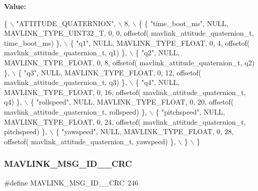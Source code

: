 {\bfseries Value\+:}
\begin{DoxyCode}
\{ \(\backslash\)
    \textcolor{stringliteral}{"ATTITUDE\_QUATERNION"}, \(\backslash\)
    8, \(\backslash\)
    \{  \{ \textcolor{stringliteral}{"time\_boot\_ms"}, NULL, MAVLINK_TYPE_UINT32_T, 0, 0, offsetof(
      mavlink_attitude_quaternion_t, time\_boot\_ms) \}, \(\backslash\)
         \{ \textcolor{stringliteral}{"q1"}, NULL, MAVLINK_TYPE_FLOAT, 0, 4, offsetof(
      mavlink_attitude_quaternion_t, q1) \}, \(\backslash\)
         \{ \textcolor{stringliteral}{"q2"}, NULL, MAVLINK_TYPE_FLOAT, 0, 8, offsetof(
      mavlink_attitude_quaternion_t, q2) \}, \(\backslash\)
         \{ \textcolor{stringliteral}{"q3"}, NULL, MAVLINK_TYPE_FLOAT, 0, 12, offsetof(
      mavlink_attitude_quaternion_t, q3) \}, \(\backslash\)
         \{ \textcolor{stringliteral}{"q4"}, NULL, MAVLINK_TYPE_FLOAT, 0, 16, offsetof(
      mavlink_attitude_quaternion_t, q4) \}, \(\backslash\)
         \{ \textcolor{stringliteral}{"rollspeed"}, NULL, MAVLINK_TYPE_FLOAT, 0, 20, offsetof(
      mavlink_attitude_quaternion_t, rollspeed) \}, \(\backslash\)
         \{ \textcolor{stringliteral}{"pitchspeed"}, NULL, MAVLINK_TYPE_FLOAT, 0, 24, offsetof(
      mavlink_attitude_quaternion_t, pitchspeed) \}, \(\backslash\)
         \{ \textcolor{stringliteral}{"yawspeed"}, NULL, MAVLINK_TYPE_FLOAT, 0, 28, offsetof(
      mavlink_attitude_quaternion_t, yawspeed) \}, \(\backslash\)
         \} \(\backslash\)
\}
\end{DoxyCode}
\mbox{\label{mavlink__msg__attitude__quaternion_8h_affe421e12351ed7b0476e25f72407934}} 
\subsubsection{M\+A\+V\+L\+I\+N\+K\+\_\+\+M\+S\+G\+\_\+\+I\+D\+\_\+\_\+\+C\+RC}
{\footnotesize\ttfamily \#define M\+A\+V\+L\+I\+N\+K\+\_\+\+M\+S\+G\+\_\+\+I\+D\+\_\+\_\+\+C\+RC~246}

\mbox{\label{mavlink__msg__attitude__quaternion_8h_a00841a5228843be0bac332bbb921b266}} 
